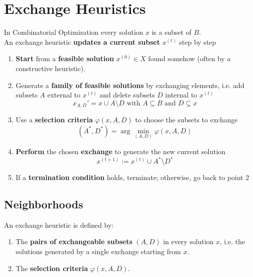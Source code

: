 \section{Exchange Heuristics}

In Combinatorial Optimization every solution $x$ is a subset of $B$.\\

An exchange heuristic \textbf{updates a current subset} $x^{(t)}$ step by step

\begin{enumerate}
	\item \textbf{Start} from a \textbf{feasible solution} $x^{(0)} \in X$ found somehow (often by a constructive heuristic).\\
	
	\item Generate a \textbf{family of feasible solutions} by exchanging elements, i.e. add subsets $A$ external to $x^{(t)}$ and delete subsets $D$ internal to $x^{(t)}$
	$$ x_{A,D}' = x \cup A \setminus D \text{ with } A \subseteq B \text{ and } D \subseteq x $$
	
	\item Use a \textbf{selection criteria} $\varphi (x, A, D)$ to choose the subsets to exchange
	$$ (A^\ast, D^\ast) = \arg \min_{(A,D)} \varphi (x, A, D) $$
	
	\item \textbf{Perform} the chosen \textbf{exchange} to generate the new current solution
	$$ x^{(t+1)} := x^{(t)} \cup A^\ast \setminus D^\ast $$
	
	\item If a \textbf{termination condition} holds, terminate; otherwise, go back to point 2
\end{enumerate}

\newpage

\subsection{Neighborhoods} 

An exchange heuristic is defined by:
\begin{enumerate}
	\item The \textbf{pairs of exchangeable subsets} $(A, D)$ in every solution $x$, i.e. the solutions generated by a single exchange starting from $x$.\\
	
	\item The \textbf{selection criteria} $\varphi (x, A, D)$.\\
\end{enumerate}

